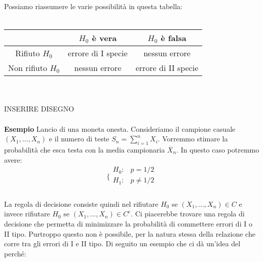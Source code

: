 Possiamo riassumere le varie possibilità in questa tabella:
\\
\\
\begin{tabular}{c|c|c}
 & $H_0$ è vera & $H_0$ è falsa \\ 
\hline 
Rifiuto $H_0$ & errore di I specie & nessun errore \\ 
\hline 
Non rifiuto $H_0$ & nessun errore & errore di II specie \\ 
\end{tabular} 
\\
\\
INSERIRE DISEGNO\\
\\
\noindent \textbf{Esempio} Lancio di una moneta onesta. Consideriamo il campione casuale $(X_1,...,X_n)$ e il numero di teste $S_n = \sum_{i=1}^n X_i$. Vorremmo stimare la probabilità che esca testa con la media campionaria $\overline{X}_n$. In questo caso potremmo avere:
\\
$$\bigg \{
\begin{array}{rl}
H_0: & p=1/2 \\
H_1: & p \neq 1/2 \\
\end{array}
$$
\\
La regola di decisione consiste quindi nel rifiutare $H_0$ se $(X_1,...,X_n) \in C$ e invece rifiutare $H_0$ se $(X_1,...,X_n) \in C^c$. Ci piacerebbe trovare una regola di decisione che permetta di minimizzare la probabilità di commettere errori di I o II tipo. Purtroppo questo non è possibile, per la natura stessa della relazione che corre tra gli errori di I e II tipo. Di seguito un esempio che ci dà un'idea del perché:\\

